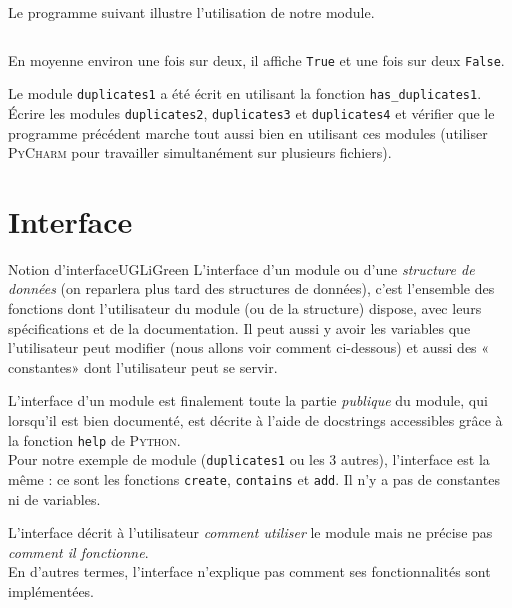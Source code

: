 \documentclass[a4paper,10pt,cours]{nsi}
\begin{document}
Le programme suivant illustre l'utilisation de notre module.

\inputminted{python}{scripts/find_duplicates1.py}

En moyenne environ une fois sur deux, il affiche \texttt{True} et une fois sur deux \texttt{False}.\\

\begin{exercice}[]
    Le module \texttt{duplicates1} a été écrit en utilisant la fonction \texttt{has\_duplicates1}.\\
    \'Ecrire les modules \texttt{duplicates2}, \texttt{duplicates3} et \texttt{duplicates4} et vérifier que le programme précédent marche tout aussi bien en utilisant ces modules (utiliser \textsc{PyCharm} pour travailler simultanément sur plusieurs fichiers).
\end{exercice}

\section{Interface}

\begin{encadrecolore}{Notion d'interface}{UGLiGreen}
    L'interface d'un module ou d'une \textit{structure de données} (on reparlera plus tard des structures de données), c'est l'ensemble des fonctions dont l'utilisateur du module (ou de la structure) dispose, avec leurs spécifications et de la documentation. Il peut aussi y avoir les variables que l'utilisateur peut modifier (nous allons voir comment ci-dessous) et aussi des « constantes» dont l'utilisateur peut se servir.\\
    
\end{encadrecolore}

L'interface d'un module est finalement toute la partie \textit{publique} du module, qui lorsqu'il est bien documenté, est décrite à l'aide de docstrings accessibles grâce à la fonction \texttt{help} de \textsc{Python}.\\
Pour notre exemple de module (\texttt{duplicates1} ou les 3 autres), l'interface est la même : ce sont les fonctions \texttt{create}, \texttt{contains} et \texttt{add}. Il n'y a pas de constantes ni de variables.

\begin{remarque}
    L'interface décrit à l'utilisateur \textit{comment utiliser} le module mais ne précise pas \textit{comment il fonctionne}.\\
    En d'autres termes, l'interface n'explique pas comment ses fonctionnalités sont implémentées.
\end{remarque}
\end{document}
